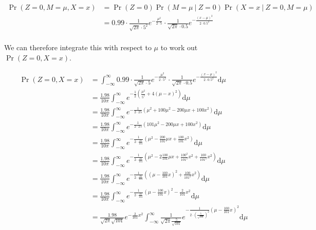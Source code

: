 \documentclass[10pt,\jkfside,a4paper]{article}
\begin{document}
\begin{enumerate}
\[
\begin{split}
\Pr(Z=0, M=\mu, X=x)
&= \Pr(Z=0)\Pr(M=\mu \ | \ Z=0)\Pr(X=x \ | \ Z=0, M=\mu) \\
&= 0.99 \cdot \frac{1}{\sqrt{2\pi} \cdot 5^2}e^{-\frac{\mu^2}{2\cdot 5}} \cdot
\frac{1}{\sqrt{2\pi}\cdot 0.5} e^{ -\frac{(x - \mu)^2}{2\cdot 0.5^2} } \\
\end{split}
\]

We can therefore integrate this with respect to $\mu$ to work out
$\Pr(Z=0, X=x)$.

\[
\begin{split}
\Pr(Z=0, X=x)
&= \int^\infty_{-\infty} 0.99 \cdot \frac{1}{\sqrt{2\pi} \cdot
5}e^{-\frac{\mu^2}{2\cdot 5^2}} \cdot \frac{1}{\sqrt{2\pi}\cdot 0.5} e^{
-\frac{(x - \mu)^2}{2\cdot 0.5^2} } \text{d}\mu \\
&= \frac{1.98}{10\pi} \int^{\infty}_{-\infty} e^{-\frac{1}{2}\left(
\frac{\mu^2}{5^2} + 4\left( \mu - x \right)^2 \right)} \text{d}\mu \\
&= \frac{1.98}{10\pi} \int^{\infty}_{-\infty} e^{-\frac{1}{2 \cdot 25}\left(
\mu^2 + 100\mu^2 - 200\mu x + 100x^2 \right)} \text{d}\mu \\
&= \frac{1.98}{10\pi} \int^{\infty}_{-\infty} e^{-\frac{1}{2 \cdot 25}\left(
101\mu^2 - 200\mu x + 100x^2 \right)} \text{d}\mu \\
&= \frac{1.98}{10\pi} \int^{\infty}_{-\infty} e^{-\frac{1}{2 \cdot
\frac{25}{101}}\left( \mu^2 - \frac{200}{101}\mu x + \frac{100}{101}x^2
\right)}\text{d}\mu \\
&= \frac{1.98}{10\pi} \int^{\infty}_{-\infty} e^{-\frac{1}{2 \cdot
\frac{25}{101}}\left( \mu^2 - 2\frac{100}{101}\mu x + \frac{100^2}{101^2}x^2
+ \frac{100}{101^2}x^2\right)}\text{d}\mu \\
&= \frac{1.98}{10\pi} \int^{\infty}_{-\infty} e^{-\frac{1}{2 \cdot
\frac{25}{101}}\left( \left(\mu - \frac{100}{101}x\right)^2
+ \frac{100}{101^2}x^2\right)}\text{d}\mu \\
&= \frac{1.98}{10\pi} \int^{\infty}_{-\infty} e^{-\frac{1}{2 \cdot
\frac{25}{101}}\left(\mu - \frac{100}{101}x\right)^2
- \frac{2}{101}x^2}\text{d}\mu \\
&= \frac{1.98}{\sqrt{2\pi}\sqrt{101}}
e^{-\frac{2}{101}x^2}\int^{\infty}_{-\infty}
\frac{1}{\sqrt{2\pi}\frac{5}{\sqrt{101}}}
e^{-\frac{1}{2 \cdot \left(\frac{5}{\sqrt{101}}\right)^2}\left(\mu -
\frac{100}{101}x\right)
^2}\text{d}\mu \\
\end{split}
\]


\end{enumerate}
\end{document}
